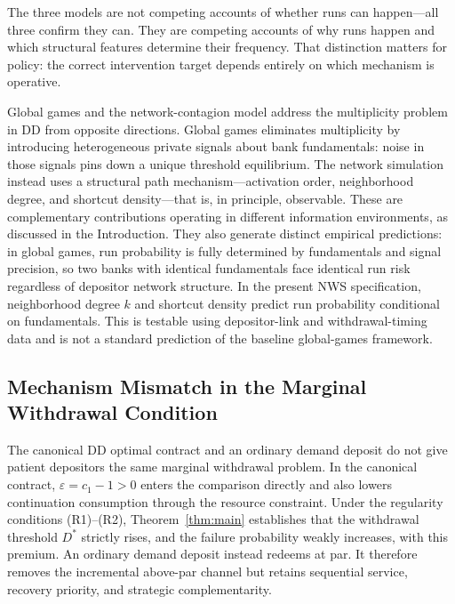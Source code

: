 \documentclass[12pt]{article}\usepackage[]{graphicx}\usepackage[]{xcolor}
\begin{document}
The three models are not competing accounts of whether runs can happen---all three confirm they can.
They are competing accounts of why runs happen and which structural features determine their frequency.
That distinction matters for policy: the correct intervention target depends entirely on which mechanism is operative.

Global games \citep{goldstein2005demand} and the network-contagion model address the multiplicity problem in DD from opposite directions.
Global games eliminates multiplicity by introducing heterogeneous private signals about bank fundamentals: noise in those signals pins down a unique threshold equilibrium.
The network simulation instead uses a structural path mechanism---activation order, neighborhood degree, and shortcut density---that is, in principle, observable.
These are complementary contributions operating in different information environments, as discussed in the Introduction.
They also generate distinct empirical predictions: in global games, run probability is fully determined by fundamentals and signal precision, so two banks with identical fundamentals face identical run risk regardless of depositor network structure.
In the present NWS specification, neighborhood degree $k$ and shortcut density predict run probability conditional on fundamentals.
This is testable using depositor-link and withdrawal-timing data and is not a standard prediction of the baseline global-games framework.

\subsection{Mechanism Mismatch in the Marginal Withdrawal Condition}

The canonical DD optimal contract and an ordinary demand deposit do not give patient depositors the same marginal withdrawal problem.
In the canonical contract, $\varepsilon=c_1-1>0$ enters the comparison directly and also lowers continuation consumption through the resource constraint.
Under the regularity conditions (R1)--(R2), Theorem~\ref{thm:main} establishes that the withdrawal threshold $D^*$ strictly rises, and the failure probability weakly increases, with this premium.
An ordinary demand deposit instead redeems at par.
It therefore removes the incremental above-par channel but retains sequential service, recovery priority, and strategic complementarity.
\end{document}
